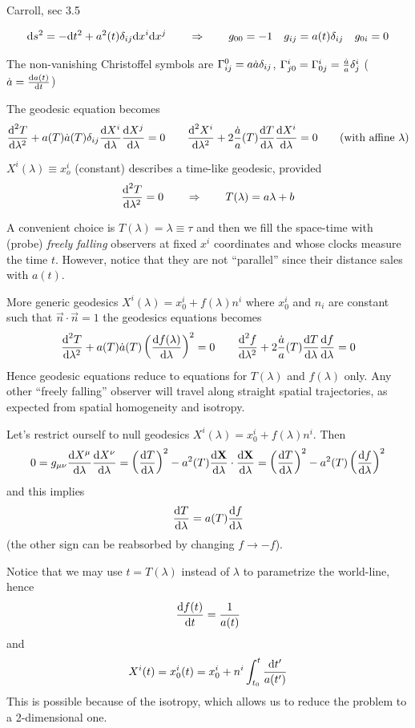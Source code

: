 \documentclass[../main/main.tex]{subfiles}
\begin{document}
\begin{example}
\textsf{Carroll, sec 3.5}

\[\textup{d} s^2=-\textup{d} t^2+a^2(t)\delta_{ij}\textup{d} x^i\textup{d} x^j\qquad\Rightarrow\qquad g_{00}=-1\quad g_{ij}=a(t)\delta_{ij}\quad g_{0i}=0\]

The non-vanishing Christoffel symbols are ${\Gamma}^{0}_{i j}=a\dot a\delta_{ij}$, ${\Gamma}^{i}_{j 0}={\Gamma}^{i}_{0 j}=\frac{\dot a}a\delta^i_j$ ($\dot a=\frac{\textup{d} a(t)}{\textup{d} t}$)

The geodesic equation becomes
\[\frac{\textup{d}^2T}{\textup{d}\lambda^2}+a(T)\dot a(T)\delta_{ij}\frac{\textup{d} X^i}{\textup{d} \lambda}\frac{\textup{d} X^j}{\textup{d} \lambda}=0
\qquad
\frac{\textup{d}^2X^i}{\textup{d}\lambda^2}+2\frac{\dot a}a(T)\frac{\textup{d} T}{\textup{d} \lambda}\frac{\textup{d} X^i}{\textup{d} \lambda}=0
\qquad(\text{with affine }\lambda)\]

$X^i(\lambda)\equiv x_o^i$ (constant) describes a time-like geodesic, provided
\[\frac{\textup{d}^2T}{\textup{d}\lambda^2}=0\qquad\Rightarrow\qquad T(\lambda)=a\lambda+b\]

A convenient choice is $T(\lambda)=\lambda\equiv\tau$ and then we fill the space-time with (probe) \emph{freely falling} observers at fixed $x^i$ coordinates and whose clocks measure the time $t$. However, notice that they are not ``parallel'' since their distance sales with $a(t)$. 

More generic geodesics $X^i(\lambda)=x_0^i+f(\lambda)n^i$ where $x_0^i$ and $n_i$ are constant such that $\vec n\cdot\vec n=1$ the geodesics equations becomes
\begin{equation}\label{eqn:geo-eqn-expand-univ}
\frac{\textup{d}^2T}{\textup{d}\lambda^2}+a(T)\dot a(T)\left(\frac{\textup{d} f(\lambda)}{\textup{d} \lambda}\right)^2=0
\qquad
\frac{\textup{d}^2 f}{\textup{d}\lambda^2}+2\frac{\dot a}a(T)\frac{\textup{d} T}{\textup{d} \lambda}\frac{\textup{d} f}{\textup{d} \lambda}=0
\end{equation}
Hence geodesic equations reduce to equations for $T(\lambda)$ and $f(\lambda)$ only. Any other ``freely falling'' observer will travel along straight spatial trajectories, as expected from spatial homogeneity and isotropy. 

Let's restrict ourself to null geodesics $X^i(\lambda)=x_0^i+f(\lambda)n^i$. Then
\[0=g_{\mu\nu}\frac{\textup{d} X^\mu}{\textup{d} \lambda}\frac{\textup{d} X^\nu}{\textup{d} \lambda}=\left(\frac{\textup{d} T}{\textup{d} \lambda}\right)^2-a^2(T)\frac{\textup{d} \mathbf X}{\textup{d} \lambda}\cdot\frac{\textup{d} \mathbf X}{\textup{d} \lambda}=\left(\frac{\textup{d} T}{\textup{d} \lambda}\right)^2-a^2(T)\left(\frac{\textup{d} f}{\textup{d} \lambda}\right)^2\]
and this implies
\begin{equation}\label{eqn:expand-univ-evolut-T}
\frac{\textup{d} T}{\textup{d} \lambda}=a(T)\frac{\textup{d} f}{\textup{d} \lambda}
\end{equation}
(the other sign can be reabsorbed by changing $f\to-f$).

Notice that we may use $t=T(\lambda)$ instead of $\lambda$ to parametrize the world-line, hence
\begin{equation}
\frac{\textup{d} f(t)}{\textup{d} t}=\frac1{a(t)}
\end{equation}
and
\begin{equation}
X^i(t)=x_0^i(t)=x_0^i+n^i\int_{t_0}^{t}\frac{\textup{d} t'}{a(t')}
\end{equation}
This is possible because of the isotropy, which allows us to reduce the problem to a 2-dimensional one. 


\end{example}
\end{document}
